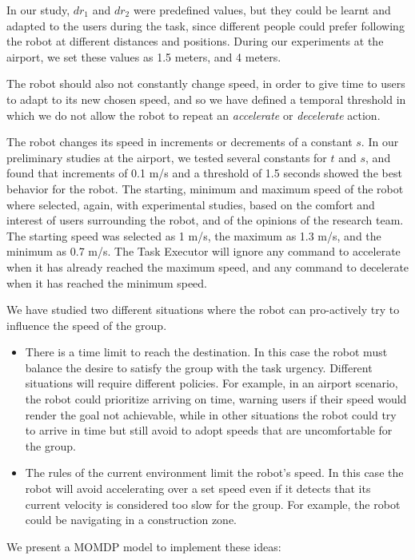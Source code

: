 In our study, $dr_1$ and $dr_2$ were predefined values, but they could be learnt and adapted to the users during the task, since different people could prefer following the robot at different distances and positions. During our experiments at the airport, we set these values as 1.5 meters, and 4 meters.

The robot should also not constantly change speed, in order to give time to users to adapt to its new chosen speed, and so we have defined a temporal threshold in which we do not allow the robot to repeat an \textit{accelerate} or \textit{decelerate} action.

The robot changes its speed in increments or decrements of a constant $s$. In our preliminary studies at the airport, we tested several constants for $t$ and $s$, and found that increments of 0.1 m/s and a threshold of 1.5 seconds showed the best behavior for the robot. The starting, minimum and maximum speed of the robot where selected, again, with experimental studies, based on the comfort and interest of users surrounding the robot, and of the opinions of the research team. The starting speed was selected as 1 m/s, the maximum as 1.3 m/s, and the minimum as 0.7 m/s. The Task Executor will ignore any command to accelerate when it has already reached the maximum speed, and any command to decelerate when it has reached the minimum speed.
  
We have studied two different situations where the robot can pro-actively try to influence the speed of the group.
\begin{itemize}
\item There is a time limit to reach the destination. In this case the robot must balance the desire to satisfy the group with the task urgency. Different situations will require different policies. For example, in an airport scenario, the robot could prioritize arriving on time, warning users if their speed would render the goal not achievable, while in other situations the robot could try to arrive in time but still avoid to adopt speeds that are uncomfortable for the group.
\item The rules of the current environment limit the robot's speed. In this case the robot will avoid accelerating over a set speed even if it detects that its current velocity is considered too slow for the group. For example, the robot could be navigating in a construction zone.
\end{itemize}

We present a MOMDP model to implement these ideas:

